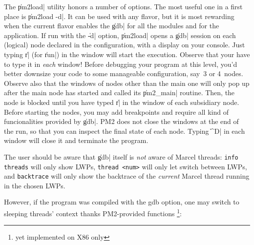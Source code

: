 The \|pm2load| utility honors a number of options.  The most useful
one in a first place is \|pm2load -d|. It can be used with any flavor,
but it is most rewarding when the current flavor enables the \|gdb|
for all the modules and for the application. If run with the \|-d|
option, \|pm2load| opens a \|gdb| session on each (logical) node
declared in the configuration, with a display on your console. Just
typing \|r| (for \|run|) in the window will start the execution.
Observe that your have to type it in \emph{each} window!  Before
debugging your program at this level, you'd better downsize your code
to some manageable configuration, say~3 or 4~nodes. Observe also that
the windows of nodes other than the main one will only pop up after
the main node has started and called its \|pm2_main| routine. Then,
the node is blocked until you have typed \|r| in the window of each
subsidiary node. Before starting the nodes, you may add breakpoints
and require all kind of funcionalities provided by \|gdb|.  PM2 does
not close the windows at the end of the run, so that you can inspect
the final state of each node. Typing \|^D| in each window will close
it and terminate the program.


The user should be aware that \|gdb| itself is \emph{not} aware
of Marcel threads: \texttt{info threads} will only show LWPs,
\texttt{thread <num>} will only let switch between LWPs, and
\texttt{backtrace} will only show the backtrace of the \emph{current}
Marcel thread running in the chosen LWPs.

However, if the program was compiled with the gdb option, one may
switch to sleeping threads' context thanks PM2-provided functions
\footnote{yet implemented on X86 only}:


